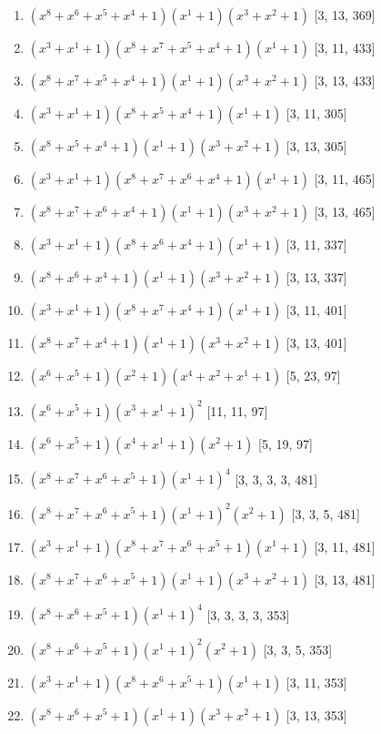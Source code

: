 \documentclass[10pt,twocolumn]{article}
\begin{document}
\begin{enumerate}
\item $(x^{8} + x^{6} + x^{5} + x^{4} + 1)(x^{1} + 1)(x^{3} + x^{2} + 1)$  [3, 13, 369]
\item $(x^{3} + x^{1} + 1)(x^{8} + x^{7} + x^{5} + x^{4} + 1)(x^{1} + 1)$  [3, 11, 433]
\item $(x^{8} + x^{7} + x^{5} + x^{4} + 1)(x^{1} + 1)(x^{3} + x^{2} + 1)$  [3, 13, 433]
\item $(x^{3} + x^{1} + 1)(x^{8} + x^{5} + x^{4} + 1)(x^{1} + 1)$  [3, 11, 305]
\item $(x^{8} + x^{5} + x^{4} + 1)(x^{1} + 1)(x^{3} + x^{2} + 1)$  [3, 13, 305]
\item $(x^{3} + x^{1} + 1)(x^{8} + x^{7} + x^{6} + x^{4} + 1)(x^{1} + 1)$  [3, 11, 465]
\item $(x^{8} + x^{7} + x^{6} + x^{4} + 1)(x^{1} + 1)(x^{3} + x^{2} + 1)$  [3, 13, 465]
\item $(x^{3} + x^{1} + 1)(x^{8} + x^{6} + x^{4} + 1)(x^{1} + 1)$  [3, 11, 337]
\item $(x^{8} + x^{6} + x^{4} + 1)(x^{1} + 1)(x^{3} + x^{2} + 1)$  [3, 13, 337]
\item $(x^{3} + x^{1} + 1)(x^{8} + x^{7} + x^{4} + 1)(x^{1} + 1)$  [3, 11, 401]
\item $(x^{8} + x^{7} + x^{4} + 1)(x^{1} + 1)(x^{3} + x^{2} + 1)$  [3, 13, 401]
\item $(x^{6} + x^{5} + 1)(x^{2} + 1)(x^{4} + x^{2} + x^{1} + 1)$  [5, 23, 97]
\item $(x^{6} + x^{5} + 1)(x^{3} + x^{1} + 1)^{2}$  [11, 11, 97]
\item $(x^{6} + x^{5} + 1)(x^{4} + x^{1} + 1)(x^{2} + 1)$  [5, 19, 97]
\item $(x^{8} + x^{7} + x^{6} + x^{5} + 1)(x^{1} + 1)^{4}$  [3, 3, 3, 3, 481]
\item $(x^{8} + x^{7} + x^{6} + x^{5} + 1)(x^{1} + 1)^{2}(x^{2} + 1)$  [3, 3, 5, 481]
\item $(x^{3} + x^{1} + 1)(x^{8} + x^{7} + x^{6} + x^{5} + 1)(x^{1} + 1)$  [3, 11, 481]
\item $(x^{8} + x^{7} + x^{6} + x^{5} + 1)(x^{1} + 1)(x^{3} + x^{2} + 1)$  [3, 13, 481]
\item $(x^{8} + x^{6} + x^{5} + 1)(x^{1} + 1)^{4}$  [3, 3, 3, 3, 353]
\item $(x^{8} + x^{6} + x^{5} + 1)(x^{1} + 1)^{2}(x^{2} + 1)$  [3, 3, 5, 353]
\item $(x^{3} + x^{1} + 1)(x^{8} + x^{6} + x^{5} + 1)(x^{1} + 1)$  [3, 11, 353]
\item $(x^{8} + x^{6} + x^{5} + 1)(x^{1} + 1)(x^{3} + x^{2} + 1)$  [3, 13, 353]

\end{enumerate}
\end{document}
